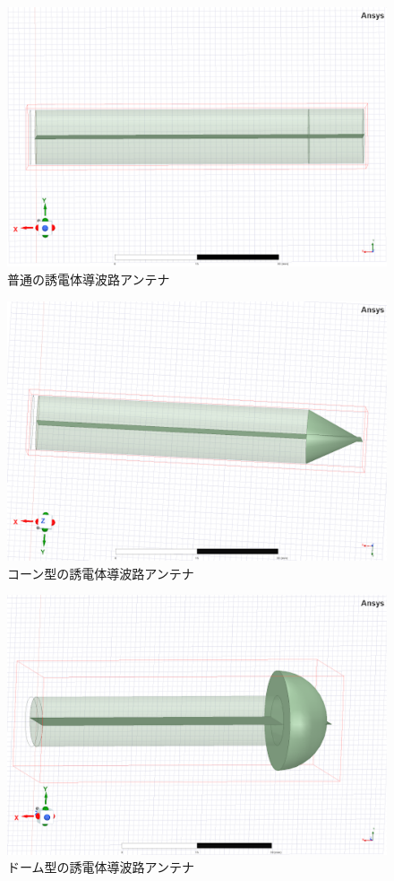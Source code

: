 \documentclass[technicalreport]{ieicej}
\begin{document}
\begin{figure}[tb]
  \begin{center}
    \includegraphics[bb=0 0 384 262, width=0.7\linewidth]{img/normal.pdf}
    \caption{普通の誘電体導波路アンテナ}
    \label{fig:normal}
  \end{center}
\end{figure}

\begin{figure}[tb]
  \begin{center}
    \includegraphics[bb=0 0 384 262, width=0.7\linewidth]{img/cone.pdf}
    \caption{コーン型の誘電体導波路アンテナ}
    \label{fig:cone}
  \end{center}
\end{figure}

\begin{figure}[tb]
  \begin{center}
    \includegraphics[bb=0 0 384 262, width=0.7\linewidth]{img/dome.pdf}
    \caption{ドーム型の誘電体導波路アンテナ}
    \label{fig:dome}
  \end{center}
\end{figure}
\end{document}
